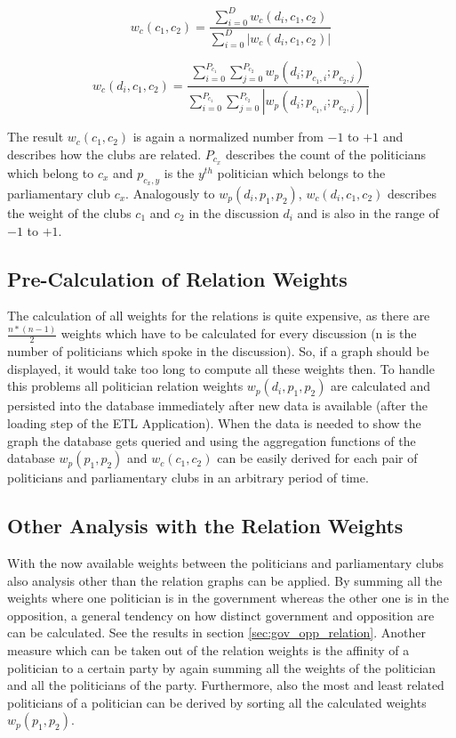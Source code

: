 $$
w_c(c_1,c_2) = \frac{\displaystyle\sum_{i=0}^{D} w_c(d_i,c_1,c_2)}{\displaystyle\sum_{i=0}^{D} |w_c(d_i,c_1,c_2)|}
$$

$$
w_c(d_i,c_1,c_2) = \frac{\displaystyle\sum_{i=0}^{P_{c_1}} \displaystyle\sum_{j=0}^{P_{c_2}} w_p(d_i;p_{c_1,i};p_{c_2,j})}{\displaystyle\sum_{i=0}^{P_{c_1}} \displaystyle\sum_{j=0}^{P_{c_2}} |w_p(d_i;p_{c_1,i};p_{c_2,j})|}
$$

The result $w_c(c_1,c_2)$ is again a normalized number from $-1$ to $+1$ and describes how the clubs are related. $P_{c_x}$ describes the count of the politicians which belong to $c_x$ and $p_{c_x,y}$ is the $y^{th}$ politician which belongs to the parliamentary club $c_x$. Analogously to $w_p(d_i,p_1,p_2)$, $w_c(d_i,c_1,c_2)$ describes the weight of the clubs $c_1$ and $c_2$ in the discussion $d_i$ and is also in the range of $-1$ to $+1$.

\subsection{Pre-Calculation of Relation Weights}
The calculation of all weights for the relations is quite expensive, as there are $\frac{n * (n - 1)}{2}$ weights which have to be calculated for every discussion (n is the number of politicians which spoke in the discussion). So, if a graph should be displayed, it would take too long to compute all these weights then. To handle this problems all politician relation weights $w_p(d_i,p_1,p_2)$ are calculated and persisted into the database immediately after new data is available (after the loading step of the ETL Application). When the data is needed to show the graph the database gets queried and using the aggregation functions of the database $w_p(p_1,p_2)$ and $w_c(c_1,c_2)$ can be easily derived for each pair of politicians and parliamentary clubs in an arbitrary period of time.

\subsection{Other Analysis with the Relation Weights}
With the now available weights between the politicians and parliamentary clubs also analysis other than the relation graphs can be applied. By summing all the weights where one politician is in the government whereas the other one is in the opposition, a general tendency on how distinct government and opposition are can be calculated. See the results in section \ref{sec:gov_opp_relation}. Another measure which can be taken out of the relation weights is the affinity of a politician to a certain party by again summing all the weights of the politician and all the politicians of the party. Furthermore, also the most and least related politicians of a politician can be derived by sorting all the calculated weights $w_p(p_1,p_2)$.



